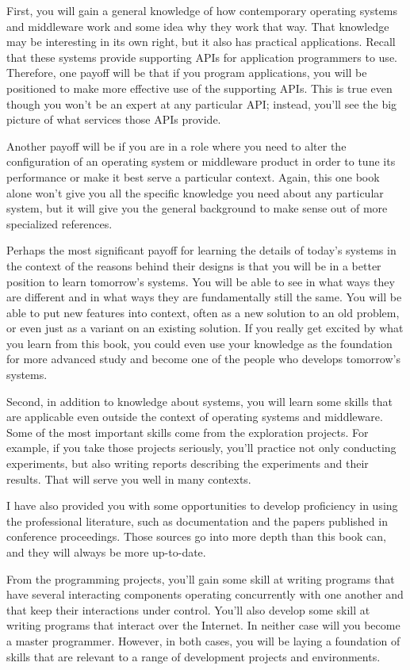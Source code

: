 First, you will gain a general knowledge of how contemporary operating
systems and middleware work and some idea why they work that way.
That knowledge may be interesting in its own right, but it also has
practical applications.  Recall that these systems provide supporting
APIs for application programmers to use.  Therefore, one payoff will
be that if you program applications, you will be positioned to make
more effective use of the supporting APIs.  This is true even though
you won't be an expert at any particular API; instead, you'll see the
big picture of what services those APIs provide.

Another payoff will be if you are in a role where you need to alter
the configuration of an operating system or middleware product in order to
tune its performance or make it best serve a particular context.
Again, this one book alone won't give you all the specific knowledge
you need about any particular system, but it will give you the general
background to make sense out of more specialized references.

Perhaps the most significant payoff for learning the details
of today's systems in the context of the reasons behind their designs
is that you will be in a better position to learn tomorrow's systems.
You will be able to see in what ways they are different and in what
ways they are fundamentally still the same.  You will be able to put
new features into context, often as a new solution to an old problem,
or even just as a variant on an existing solution.  If you really get
excited by what you learn from this book, you could even use your
knowledge as the foundation for more advanced study and become one of
the people who develops tomorrow's systems.

Second, in addition to knowledge about systems, you will learn some
skills that are applicable even outside the context of operating
systems and middleware.  Some of the most important skills come from the
exploration projects.  For example, if you take those projects
seriously, you'll practice not only conducting experiments, but also
writing reports describing the experiments and their results.  That
will serve you well in many contexts.

I have also
provided you with some opportunities to develop proficiency in using the
professional literature, such as
documentation and the papers published in conference proceedings.
Those sources go into more depth than this book can, and they will
always be more up-to-date.

From the programming projects, you'll gain some skill at writing
programs that have several interacting components operating
concurrently with one another and that keep their interactions under
control.  You'll also develop some skill at writing programs that
interact over the Internet.  In neither case will you become a master
programmer.  However, in both cases, you will be laying a foundation of
skills that are relevant to a range of development projects and
environments.

